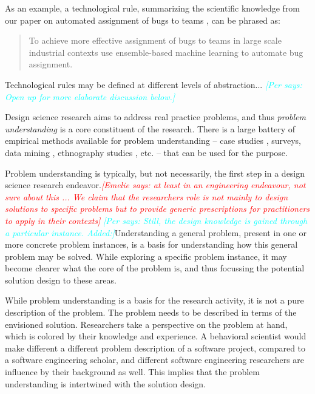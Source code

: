 \documentclass[graybox]{svmult}
\newcommand{\emelie}[1]{\textcolor{red}{{\it [Emelie says: #1]}}}
\newcommand{\per}[1]{\textcolor{cyan}{{\it [Per says: #1]}}}
\newcommand{\emelie}[1]{}
\newcommand{\per}[1]{}
\begin{document}
As an example, a technological rule, summarizing the scientific knowledge from our paper on automated assignment of bugs to teams \cite{JonssonBug15}, can be phrased as:
\begin{quote}{To achieve more effective assignment of bugs to teams in large scale industrial contexts use ensemble-based machine learning to automate bug assignment. \cite{StoreyESEM17}}\end{quote}

Technological rules may be defined at different levels of abstraction... \per{Open up for more elaborate discussion below.}


Design science research aims to address real practice problems, and thus \emph{problem understanding} is a core constituent of the research. There is a large battery of empirical methods available for problem understanding -- case studies \cite{Runeson12Case}, surveys, data mining \cite{MenziesDataMining2016}, ethnography studies \cite{SharpEthnography2016}, etc. -- that can be used for the purpose.

Problem understanding is typically, but not necessarily, the first step in a design science research endeavor.\emelie{at least in an engineering endeavour, not sure about this ... We claim that the researchers role is not mainly to design solutions to specific problems but to provide generic prescriptions for practitioners to apply in their contexts} \per{Still, the design knowledge is gained through a particular instance. Added:}Understanding a general problem, present in one or more concrete problem instances, is a basis for understanding how this general problem may be solved.  While exploring a specific problem instance,   it may become clearer what the core of the problem is, and thus focussing the potential solution design to these areas. 

While problem understanding is a basis for the research activity, it is not a pure description of the problem. The problem needs to be described in terms of the envisioned solution. Researchers take a perspective on the problem at hand, which is colored by their knowledge and experience. A behavioral scientist would make different a different problem description of a software project, compared to a software engineering scholar, and different software engineering researchers are influence by their background as well. This implies that the problem understanding is intertwined with the solution design.
\end{document}
